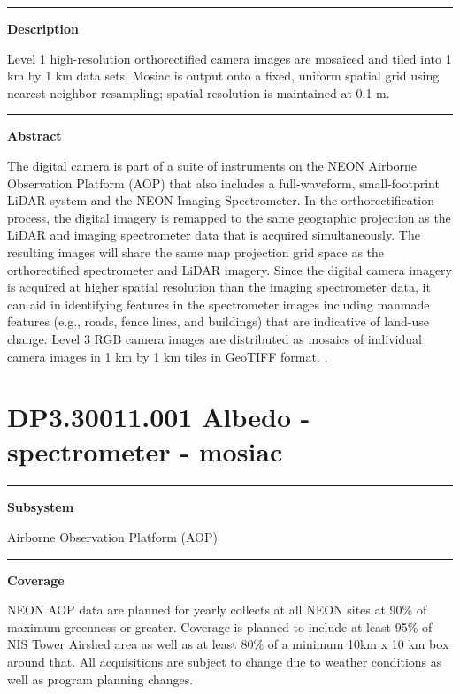 \documentclass[]{article}
\begin{document}
\begin{center}\rule{0.5\linewidth}{\linethickness}\end{center}

\textbf{Description}

Level 1 high-resolution orthorectified camera images are mosaiced and
tiled into 1 km by 1 km data sets. Mosiac is output onto a fixed,
uniform spatial grid using nearest-neighbor resampling; spatial
resolution is maintained at 0.1 m.

\begin{center}\rule{0.5\linewidth}{\linethickness}\end{center}

\textbf{Abstract}

The digital camera is part of a suite of instruments on the NEON
Airborne Observation Platform (AOP) that also includes a full-waveform,
small-footprint LiDAR system and the NEON Imaging Spectrometer. In the
orthorectification process, the digital imagery is remapped to the same
geographic projection as the LiDAR and imaging spectrometer data that is
acquired simultaneously. The resulting images will share the same map
projection grid space as the orthorectified spectrometer and LiDAR
imagery. Since the digital camera imagery is acquired at higher spatial
resolution than the imaging spectrometer data, it can aid in identifying
features in the spectrometer images including manmade features (e.g.,
roads, fence lines, and buildings) that are indicative of land-use
change. Level 3 RGB camera images are distributed as mosaics of
individual camera images in 1 km by 1 km tiles in GeoTIFF format.
\newpage
.

\section{DP3.30011.001 Albedo - spectrometer -
mosiac}\label{dp3.30011.001-albedo---spectrometer---mosiac}

\begin{center}\rule{0.5\linewidth}{\linethickness}\end{center}

\textbf{Subsystem}

Airborne Observation Platform (AOP)

\begin{center}\rule{0.5\linewidth}{\linethickness}\end{center}

\textbf{Coverage}

NEON AOP data are planned for yearly collects at all NEON sites at 90\%
of maximum greenness or greater. Coverage is planned to include at least
95\% of NIS Tower Airshed area as well as at least 80\% of a minimum
10km x 10 km box around that. All acquisitions are subject to change due
to weather conditions as well as program planning changes.
\end{document}
